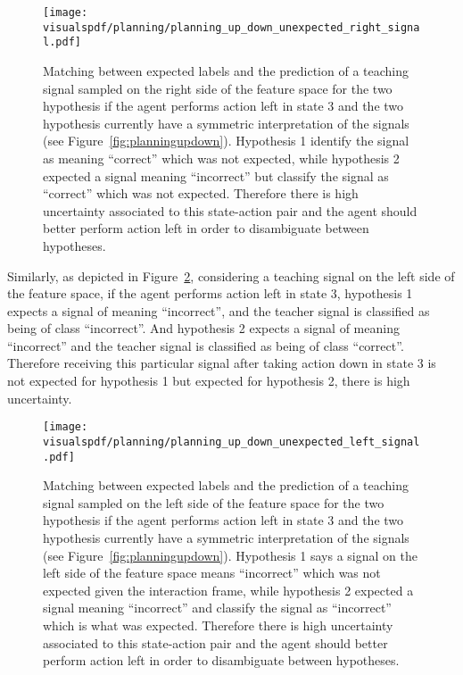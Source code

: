 \begin{figure}[H]
  \centering
  \texttt{[image: \\visualspdf/planning/planning\_up\_down\_unexpected\_right\_signal.pdf]}
  \caption{Matching between expected labels and the prediction of a teaching signal sampled on the right side of the feature space for the two hypothesis if the agent performs action left in state 3 and the two hypothesis currently have a symmetric interpretation of the signals (see Figure~\ref{fig:planningupdown}). Hypothesis 1 identify the signal as meaning ``correct'' which was not expected, while hypothesis 2 expected a signal meaning ``incorrect'' but classify the signal as ``correct'' which was not expected. Therefore there is high uncertainty associated to this state-action pair and the agent should better perform action left in order to disambiguate between hypotheses.}
  \label{fig:uncertaintymeaningupdownunexpectedright}
\end{figure}

\newpage

Similarly, as depicted in Figure~\ref{fig:uncertaintymeaningupdownunexpectedleft}, considering a teaching signal on the left side of the feature space, if the agent performs action left in state 3, hypothesis 1 expects a signal of meaning ``incorrect'', and the teacher signal is classified as being of class ``incorrect''. And hypothesis 2 expects a signal of meaning ``incorrect'' and the teacher signal is classified as being of class ``correct''. Therefore receiving this particular signal after taking action down in state 3 is not expected for hypothesis 1 but expected for hypothesis 2, there is high uncertainty.

\begin{figure}[H]
  \centering
  \texttt{[image: \\visualspdf/planning/planning\_up\_down\_unexpected\_left\_signal.pdf]}
  \caption{Matching between expected labels and the prediction of a teaching signal sampled on the left side of the feature space for the two hypothesis if the agent performs action left in state 3 and the two hypothesis currently have a symmetric interpretation of the signals (see Figure~\ref{fig:planningupdown}). Hypothesis 1 says a signal on the left side of the feature space means ``incorrect'' which was not expected given the interaction frame, while hypothesis 2 expected a signal meaning ``incorrect'' and classify the signal as ``incorrect'' which is what was expected. Therefore there is high uncertainty associated to this state-action pair and the agent should better perform action left in order to disambiguate between hypotheses.}
  \label{fig:uncertaintymeaningupdownunexpectedleft}
\end{figure}

